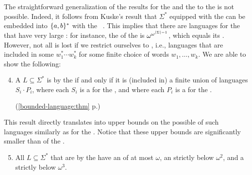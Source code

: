 \AP The straightforward generalization of the results for the  and the  to the  is not
possible. Indeed, it follows from Kuske's result that $\Sigma^*$ equipped with
the  can be embedded into $\{ a,b \}^*$ with the ~\cite[Lemma 5.1]{DBLP:journals/ita/Kuske06}. This implies that there
are  languages for the  that have
very large : for instance, the 
of the  is $\omega^{\omega^{\left| \Sigma \right| - 1}}$, which
equals its  \cite[Corollary 3.9, Theorem 4.21]{DZSCSC20}.
However, not all is lost if we restrict ourselves to ,
i.e., languages that are included in some $w_1^* \cdots w_k^*$ for some finite
choice of words $w_1, \ldots, w_k$. We are able to show the following:

{
\renewcommand{\labelenumi}{R\arabic{enumi}}
\begin{enumerate}
	\setcounter{enumi}{3}
    \item A  $L \subseteq \Sigma^*$ is  by the  if and only if it is (included in) a finite union of languages $S_i \cdot P_i$, where each $S_i$ 
        is a  for the ,
        and where
        each $P_i$ is a  for the .

        \hfill
        (\cref{bounded-language:thm} p.\pageref{bounded-language:thm})
\end{enumerate}
}

This result directly translates into upper bounds on the possible 
of such languages similarly as for the . Notice that these
upper bounds are significantly smaller than  of the .
{
\renewcommand{\labelenumi}{R\arabic{enumi}}
\begin{enumerate}
    \setcounter{enumi}{4}
    \item All 
            $L \subseteq \Sigma^*$ that are  by the 
            have an  of at most $\omega$,
            an  strictly below $\omega^2$, and
            a  strictly below $\omega^3$.
\end{enumerate}
}

